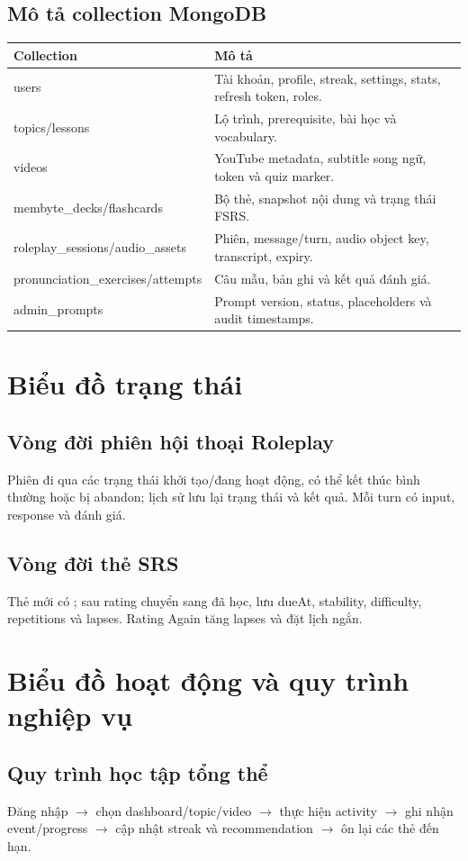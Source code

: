 \documentclass[12pt,a4paper]{report}
\newcommand{\code}[1]{\texttt{\detokenize{#1}}}
\begin{document}
\subsection{Mô tả collection MongoDB}
\begin{longtable}{p{}p{}}\toprule
Collection & Mô tả\\\midrule
users & Tài khoản, profile, streak, settings, stats, refresh token, roles.\\
topics/lessons & Lộ trình, prerequisite, bài học và vocabulary.\\
videos & YouTube metadata, subtitle song ngữ, token và quiz marker.\\
membyte\_decks/flashcards & Bộ thẻ, snapshot nội dung và trạng thái FSRS.\\
roleplay\_sessions/audio\_assets & Phiên, message/turn, audio object key, transcript, expiry.\\
pronunciation\_exercises/attempts & Câu mẫu, bản ghi và kết quả đánh giá.\\
admin\_prompts & Prompt version, status, placeholders và audit timestamps.\\
\bottomrule\end{longtable}

\section{Biểu đồ trạng thái}
\subsection{Vòng đời phiên hội thoại Roleplay}
Phiên đi qua các trạng thái khởi tạo/đang hoạt động, có thể kết thúc bình thường hoặc bị abandon; lịch sử lưu lại trạng thái và kết quả. Mỗi turn có input, response và đánh giá.
\subsection{Vòng đời thẻ SRS}
Thẻ mới có \code{isNew=true}; sau rating chuyển sang đã học, lưu dueAt, stability, difficulty, repetitions và lapses. Rating Again tăng lapses và đặt lịch ngắn.

\section{Biểu đồ hoạt động và quy trình nghiệp vụ}
\subsection{Quy trình học tập tổng thể}
Đăng nhập $\rightarrow$ chọn dashboard/topic/video $\rightarrow$ thực hiện activity $\rightarrow$ ghi nhận event/progress $\rightarrow$ cập nhật streak và recommendation $\rightarrow$ ôn lại các thẻ đến hạn.
\end{document}
